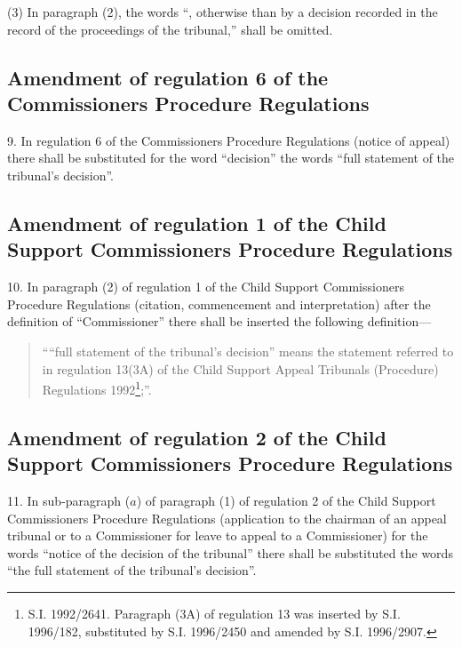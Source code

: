 \documentclass[12pt,a4paper]{article}
\begin{document}
(3) In paragraph (2), the words “, otherwise than by a decision recorded in the record of the proceedings of the tribunal,” shall be omitted.

\subsection[9. Amendment of regulation 6 of the Commissioners Procedure Regulations]{Amendment of regulation 6 of the Commissioners Procedure Regulations}

9.  In regulation 6 of the Commissioners Procedure Regulations (notice of appeal) there shall be substituted for the word “decision” the words “full statement of the tribunal’s decision”.

\subsection[10. Amendment of regulation 1 of the Child Support Commissioners Procedure Regulations]{Amendment of regulation 1 of the Child Support Commissioners Procedure Regulations}

10.  In paragraph (2) of regulation 1 of the Child Support Commissioners Procedure Regulations (citation, commencement and interpretation) after the definition of “Commissioner” there shall be inserted the following definition—
\begin{quotation}
““full statement of the tribunal’s decision” means the statement referred to in regulation 13(3A) of the Child Support Appeal Tribunals (Procedure) Regulations 1992\footnote{\frenchspacing S.I. 1992/2641. Paragraph (3A) of regulation 13 was inserted by S.I. 1996/182, substituted by S.I. 1996/2450 and amended by S.I. 1996/2907.};”.
\end{quotation}

\subsection[11. Amendment of regulation 2 of the Child Support Commissioners Procedure Regulations]{Amendment of regulation 2 of the Child Support Commissioners Procedure Regulations}

11.  In sub-paragraph ($a$) of paragraph (1) of regulation 2 of the Child Support Commissioners Procedure Regulations (application to the chairman of an appeal tribunal or to a Commissioner for leave to appeal to a Commissioner) for the words “notice of the decision of the tribunal” there shall be substituted the words “the full statement of the tribunal’s decision”.
\end{document}
